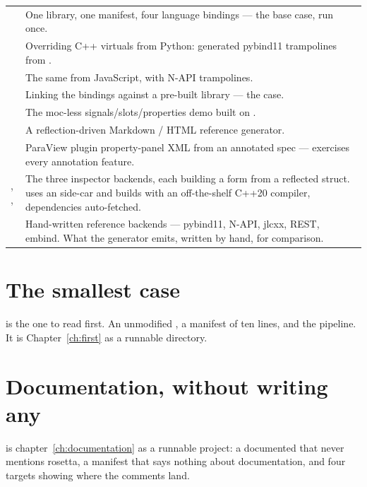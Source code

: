 \begin{center}
\begin{longtable}{@{}L{5.1cm}L{8.5cm}@{}}
 &
  One library, one manifest, four language bindings --- the base case, run
  once. \\
\addlinespace
{} &
  Overriding C++ virtuals from Python: generated pybind11 trampolines from
  . \\
\addlinespace
{} &
  The same from JavaScript, with N-API trampolines. \\
\addlinespace
{} &
  Linking the bindings against a pre-built library --- the 
  case. \\
\addlinespace
{} &
  The moc-less signals/slots/properties demo built on . \\
\addlinespace
{} &
  A reflection-driven Markdown / HTML reference generator. \\
\addlinespace
{} &
  ParaView plugin property-panel XML from an annotated 
  spec --- exercises every annotation feature. \\
\addlinespace
{}, ,  &
  The three inspector backends, each building a form from a reflected struct.
   uses an  side-car and builds with an
  off-the-shelf C++20 compiler, dependencies auto-fetched. \\
\addlinespace
{} &
  Hand-written reference backends --- pybind11, N-API, jlcxx, REST, embind.
  What the generator emits, written by hand, for comparison. \\
\bottomrule
\end{longtable}
\end{center}

\section{The smallest case}

 is the one to read first. An unmodified
, a manifest of ten lines, and the pipeline. It is
Chapter~\ref{ch:first} as a runnable directory.

\section{Documentation, without writing any}

 is chapter~\ref{ch:documentation} as a runnable
project: a documented  that never mentions rosetta, a manifest
that says nothing about documentation, and four targets showing where the
comments land.

